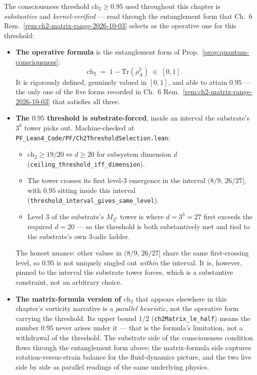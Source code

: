 \begin{remark}
\label{rem:ch05-ch2-095-disclosure}
The consciousness threshold $\mathrm{ch}_2 \geq 0.95$ used throughout this
chapter is \emph{substantive} and \emph{kernel-verified} --- read through the
entanglement form that Ch.~6 Rem.~\ref{rem:ch2-matrix-range-2026-10-03} selects
as the operative one for this threshold:

\begin{itemize}
\item \textbf{The operative formula} is the entanglement form of
      Prop.~\ref{prop:quantum-consciousness}:
      \[
         \mathrm{ch}_2 \;=\; 1 - \mathrm{Tr}(\rho_A^2) \;\in\; [0,1].
      \]
      It is rigorously defined, genuinely valued in $[0,1]$, and able to attain
      $0.95$ --- the only one of the five forms recorded in Ch.~6
      Rem.~\ref{rem:ch2-matrix-range-2026-10-03} that satisfies all three.

\item \textbf{The $0.95$ threshold is substrate-forced}, inside an interval
      the substrate's $3^k$ tower picks out. Machine-checked at
      \texttt{PF\_Lean4\_Code/PF/Ch2ThresholdSelection.lean}:
      \begin{itemize}
      \item $\mathrm{ch}_2 \geq 19/20 \iff d \geq 20$ for subsystem dimension
            $d$ (\texttt{ceiling\_threshold\_iff\_dimension}).
      \item The tower crosses its first level-$3$ emergence in the interval
            $(8/9,\,26/27]$, with $0.95$ sitting inside this interval
            (\texttt{threshold\_interval\_gives\_same\_level}).
      \item Level $3$ of the substrate's $M_{3^k}$ tower is where
            $d = 3^3 = 27$ first exceeds the required $d = 20$ --- so the
            threshold is both substantively met and tied to the substrate's
            own $3$-adic ladder.
      \end{itemize}
      The honest nuance: other values in $(8/9,\,26/27]$ share the same
      first-crossing level, so $0.95$ is not uniquely singled out \emph{within}
      the interval. It is, however, pinned to the interval the substrate tower
      forces, which is a substantive constraint, not an arbitrary choice.

\item \textbf{The matrix-formula version of $\mathrm{ch}_2$} that appears
      elsewhere in this chapter's vorticity narrative is a \emph{parallel
      heuristic}, not the operative form carrying the threshold. Its upper
      bound $1/2$ (\texttt{ch2Matrix\_le\_half}) means the number $0.95$ never
      arises under it --- that is the formula's limitation, not a withdrawal
      of the threshold. The substrate side of the consciousness condition
      flows through the entanglement form above; the matrix-formula side
      captures rotation-versus-strain balance for the fluid-dynamics picture,
      and the two live side by side as parallel readings of the same
      underlying physics.


\end{itemize}
\end{remark}
